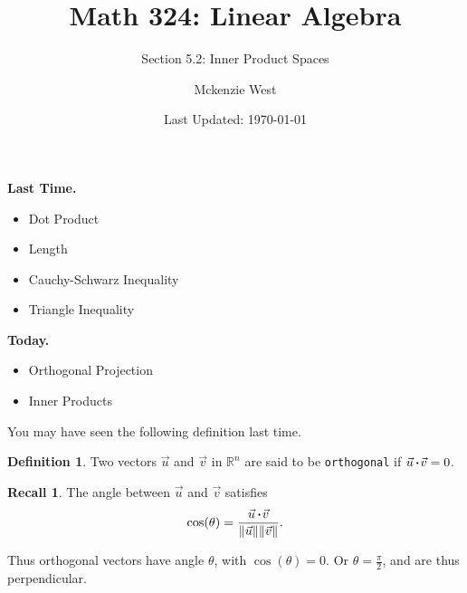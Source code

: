 \documentclass{beamer}
\newcommand{\R}{\mathbb{R}}
\newcommand{\fn}{\insertframenumber}
\newcommand{\dotp}{\,{\boldsymbol{\cdot}\hspace*{.01in}}}
\theoremstyle{definition}
\newtheorem*{defn}{Definition}
\newtheorem*{recall}{Recall}
\renewcommand{\emph}[1]{{\color{blue}\texttt{#1}}}
\begin{document}
	\title{Math 324: Linear Algebra}
	\subtitle{Section 5.2: Inner Product Spaces}
	\author{Mckenzie West}
	\date{Last Updated: \today}
\begin{frame}
\maketitle
\end{frame}

\begin{frame}{\insertframenumber}
	\begin{block}{\textbf{Last Time.}}
	\begin{itemize}[label=--]
		\item Dot Product
		\item Length
		\item Cauchy-Schwarz Inequality
		\item Triangle Inequality
	\end{itemize}
	\end{block}
	\begin{block}{\textbf{Today.}}
		\begin{itemize}[label=--]
			\item Orthogonal Projection
			\item Inner Products
		\end{itemize}
	\end{block}
\end{frame}
\begin{frame}{\fn}
	You  may have seen the following definition last time.
	\begin{defn}
		Two vectors $\vec u$ and $\vec v$ in $\R^n$ are said to be \emph{orthogonal} if $\vec u\dotp\vec v=0$.
	\end{defn}
	\begin{recall}
		The angle between $\vec u$ and $\vec v$ satisfies $$\cos(\theta)=\frac{\vec u\dotp \vec v}{\|\vec u\|\|\vec v\|}.$$
		
		Thus orthogonal vectors have angle $\theta$, with $\cos(\theta)=0$.  Or $\theta=\frac{\pi}{2}$, and are thus perpendicular.
	\end{recall}
\end{frame}
\end{document}
